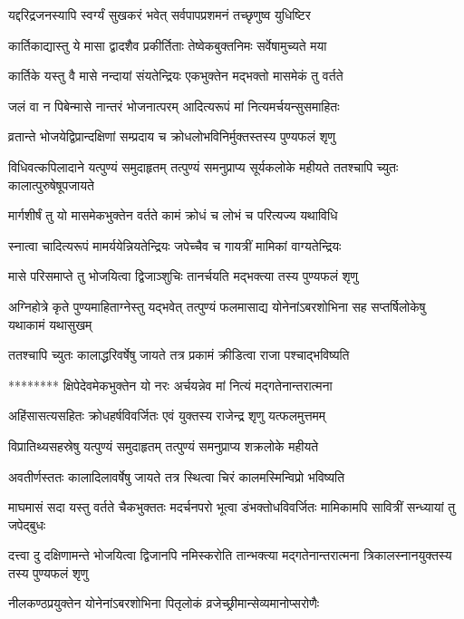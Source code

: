 \twolineshloka
{यद्दरिद्रजनस्यापि स्वर्ग्यं सुखकरं भवेत्}
{सर्वपापप्रशमनं तच्छृणुष्व युधिष्टिर}


\twolineshloka
{कार्तिकाद्यास्तु ये मासा द्वादशैव प्रकीर्तिताः}
{तेष्वेकबुक्तनिमः सर्वेषामुच्यते मया}


\twolineshloka
{कार्तिके यस्तु वै मासे नन्दायां संयतेन्द्रियः}
{एकभुक्तेन मद्भक्तो मासमेकं तु वर्तते}


\twolineshloka
{जलं वा न पिबेन्मासे नान्तरं भोजनात्परम्}
{आदित्यरूपं मां नित्यमर्चयन्सुसमाहितः}


\twolineshloka
{व्रतान्ते भोजयेद्विप्रान्दक्षिणां सम्प्रदाय च}
{क्रोधलोभविनिर्मुक्तस्तस्य पुण्यफलं शृणु}


\threelineshloka
{विधिवत्कपिलादाने यत्पुण्यं समुदाहृतम्}
{तत्पुण्यं समनुप्राप्य सूर्यकलोके महीयते}
{ततश्चापि च्युतः कालात्पुरुषेषूपजायते}


\twolineshloka
{मार्गशीर्षं तु यो मासमेकभुक्तेन वर्तते}
{कामं क्रोधं च लोभं च परित्यज्य यथाविधि}


\twolineshloka
{स्नात्वा चादित्यरूपं मामर्ययेन्नियतेन्द्रियः}
{जपेच्चैव च गायत्रीं मामिकां वाग्यतेन्द्रियः}


\twolineshloka
{मासे परिसमाप्ते तु भोजयित्वा द्विजाञ्शुचिः}
{तानर्चयति मद्भक्त्या तस्य पुण्यफलं शृणु}


\threelineshloka
{अग्निहोत्रे कृते पुण्यमाहिताग्नेस्तु यद्भवेत्}
{तत्पुण्यं फलमासाद्य योनेनांऽबरशोभिना}
{सह सप्तर्षिलोकेषु यथाकामं यथासुखम्}


\twolineshloka
{ततश्चापि च्युतः कालाद्धरिवर्षेषु जायते}
{तत्र प्रकामं क्रीडित्वा राजा पश्चाद्भविष्यति}


\twolineshloka
{******** क्षिपेदेवमेकभुक्तेन यो नरः}
{अर्चयन्नेव मां नित्यं मद्गतेनान्तरात्मना}


\twolineshloka
{अहिंसासत्यसहितः क्रोधहर्षविवर्जितः}
{एवं युक्तस्य राजेन्द्र शृणु यत्फलमुत्तमम्}


\twolineshloka
{विप्रातिथ्यसहस्रेषु यत्पुण्यं समुदाहृतम्}
{तत्पुण्यं समनुप्राप्य शक्रलोके महीयते}


\twolineshloka
{अवतीर्णस्ततः कालादिलावर्षेषु जायते}
{तत्र स्थित्वा चिरं कालमस्मिन्विप्रो भविष्यति}


\threelineshloka
{माघमासं सदा यस्तु वर्तते चैकभुक्ततः}
{मदर्चनपरो भूत्वा डंभक्तोधविवर्जितः}
{मामिकामपि सावित्रीं सन्ध्यायां तु जपेद्बुधः}


\threelineshloka
{दत्त्वा दु दक्षिणामन्ते भोजयित्वा द्विजानपि}
{नमिस्करोति तान्भक्त्या मद्गतेनान्तरात्मना}
{त्रिकालस्नानयुक्तस्य तस्य पुण्यफलं शृणु}


\twolineshloka
{नीलकण्ठप्रयुक्तेन योनेनांऽबरशोभिना}
{पितृलोकं व्रजेच्छ्रीमान्सेव्यमानोप्सरोणैः}


